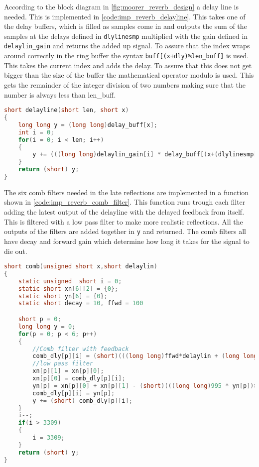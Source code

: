 According to the block diagram in \autoref{fig:moorer_reverb_design} a delay line is needed. This is implemented in \autoref{code:imp_reverb_delayline}. This takes one of the delay buffers, which is filled as samples come in and outputs the sum of the samples at the delays defined in \texttt{dlylinesmp} multiplied with the gain defined in \texttt{delaylin_gain} and returns the added up signal. To assure that the index wraps around correctly in the ring buffer the syntax \texttt{buff[(x+dly)\%len_buff]} is used. This takes the current index and adds the delay. To assure that this does not get bigger than the size of the buffer the mathematical operator modulo is used. This gets the remainder of the integer division of two numbers making sure that the number is always less than len_buff. 


\begin{lstlisting}[caption={Implementation of a delay line.},language=C,label={code:imp_reverb_delayline},tabsize=2]
short delayline(short len, short x)
{
	long long y = (long long)delay_buff[x];
	int i = 0;
	for(i = 0; i < len; i++)
	{
		y += (((long long)delaylin_gain[i] * delay_buff[(x+(dlylinesmp[i]))%DelayBuff])>>10);
	}
	return (short) y;
}
\end{lstlisting}

The six comb filters needed in the late reflections are implemented in a function shown in \autoref{code:imp_reverb_comb_filter}. This function runs trough each filter adding the latest output of the delayline with the delayed feedback from itself. This is filtered with a low pass filter to make more realistic reflections. All the outputs of the filters are added together in \texttt{y} and returned. 
The comb filters all have decay and forward gain which determine how long it takes for the signal to die out.

\begin{lstlisting}[caption={Implementation of 6 parallel comb filters.},language=C,label={code:imp_reverb_comb_filter},tabsize=2]
short comb(unsigned short x,short delaylin)
{
	static unsigned  short i = 0;
	static short xn[6][2] = {0};
	static short yn[6] = {0};
	static short decay = 10, ffwd = 100

	short p = 0;
	long long y = 0;
	for(p = 0; p < 6; p++)
	{
		//Comb filter with feedback
		comb_dly[p][i] = (short)(((long long)ffwd*delaylin + (long long)decay*comb_dly[p][(i+dlyz[p])%3309])>>10);
		//low pass filter
		xn[p][1] = xn[p][0];
		xn[p][0] = comb_dly[p][i];
		yn[p] = xn[p][0] + xn[p][1] - (short)(((long long)995 * yn[p])>>10);
		comb_dly[p][i] = yn[p];
		y += (short) comb_dly[p][i];
	}
	i--;
	if(i > 3309)
	{
		i = 3309;
	}
	return (short) y;
}
\end{lstlisting}

